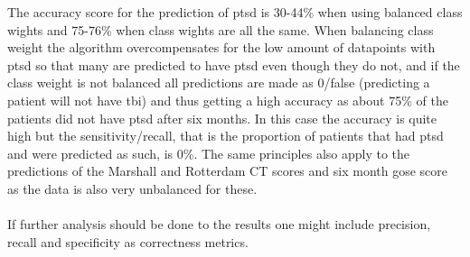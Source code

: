 \documentclass[11pt]{article}
\begin{document}
The accuracy score for the prediction of \gls{ptsd} is 30-44\% when using balanced class wights and 75-76\% when class wights are all the same. When balancing class weight the algorithm overcompensates for the low amount of datapoints with \gls{ptsd} so that many are predicted to have \gls{ptsd} even though they do not, and if the class weight is not balanced all predictions are made as 0/false (predicting a patient will not have \gls{tbi}) and thus getting a high accuracy as about 75\% of the patients did not have \gls{ptsd} after six months. In this case the accuracy is quite high but the sensitivity/recall, that is the proportion of patients that had \gls{ptsd} and were predicted as such, is 0\%. The same principles also apply to the predictions of the Marshall and Rotterdam CT scores and six month \gls{gose} score as the data is also very unbalanced for these.\\
\\
If further analysis should be done to the results one might include precision, recall and specificity as correctness metrics.
\end{document}
